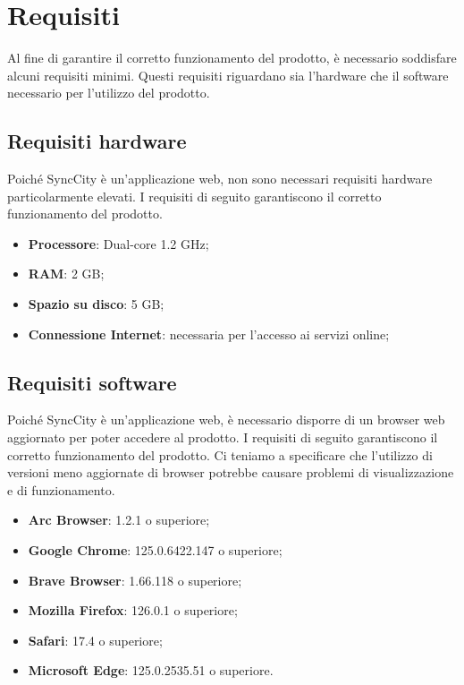 \section{Requisiti}
Al fine di garantire il corretto funzionamento del prodotto, è necessario soddisfare alcuni requisiti minimi. Questi requisiti riguardano sia l'hardware che il software necessario per l'utilizzo del prodotto.
\subsection{Requisiti hardware}
Poiché SyncCity è un'applicazione web, non sono necessari requisiti hardware particolarmente elevati. I requisiti di seguito garantiscono il corretto funzionamento del prodotto.
\begin{itemize}
    \item \textbf{Processore}: Dual-core 1.2 GHz;
    \item \textbf{RAM}: 2 GB;
    \item \textbf{Spazio su disco}: 5 GB;
    \item \textbf{Connessione Internet}: necessaria per l'accesso ai servizi online;
\end{itemize}
\subsection{Requisiti software}
Poiché SyncCity è un'applicazione web, è necessario disporre di un browser web aggiornato per poter accedere al prodotto. I requisiti di seguito garantiscono il corretto funzionamento del prodotto. Ci teniamo a specificare che l'utilizzo di versioni meno aggiornate di browser potrebbe causare problemi di visualizzazione e di funzionamento.
\begin{itemize}
    \item \textbf{Arc Browser}: 1.2.1 o superiore;
    \item \textbf{Google Chrome}: 125.0.6422.147 o superiore;
    \item \textbf{Brave Browser}: 1.66.118 o superiore;
    \item \textbf{Mozilla Firefox}: 126.0.1 o superiore;
    \item \textbf{Safari}: 17.4 o superiore;
    \item \textbf{Microsoft Edge}: 125.0.2535.51 o superiore.
\end{itemize}
